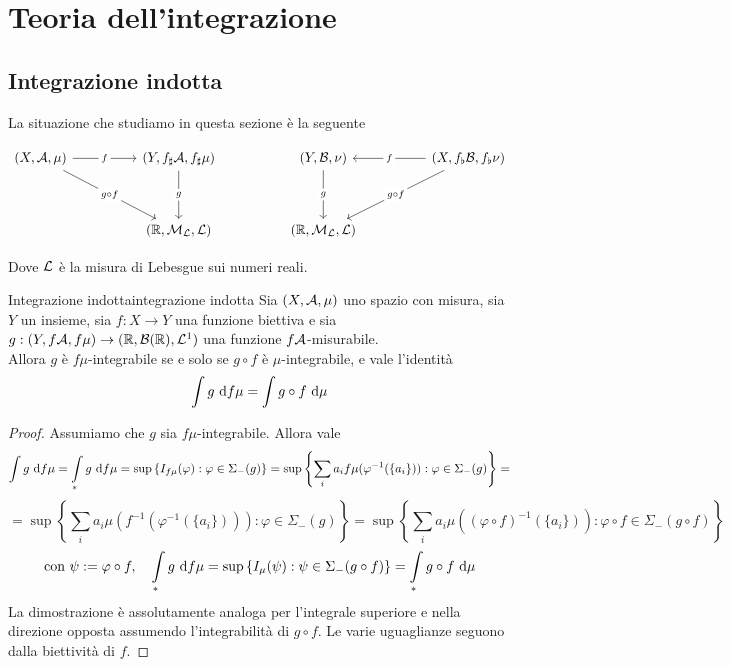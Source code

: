 \documentclass{article}
\renewcommand\A{\mc{A}}
\begin{document}
\section{Teoria dell'integrazione}

\subsection{Integrazione indotta}

La situazione che studiamo in questa sezione è la seguente

\[\begin{tikzcd}
	{(X,\A,\mu)} && {(Y, f_\sharp\A, f_\sharp\mu)} && {(Y, \B, \nu)} && {(X, f_\flat\B, f_\flat\nu)} \\
	\\
	&& {(\R, \M_\L, \L)} && {(\R,\M_\L, \L)}
	\arrow["f"{description}, from=1-1, to=1-3]
	\arrow["{g \circ f}"{description}, from=1-1, to=3-3]
	\arrow["g"{description}, from=1-3, to=3-3]
	\arrow["g"{description}, from=1-5, to=3-5]
	\arrow["f"{description}, from=1-7, to=1-5]
	\arrow["{g \circ f}"{description}, from=1-7, to=3-5]
\end{tikzcd}\]

Dove $\mathcal{L}$ è la misura di Lebesgue sui numeri reali.

\begin{theorem}{Integrazione indotta}{integrazione indotta}
    Sia $(X,\mathcal{A},\mu)$ uno spazio con misura, sia $Y$ un insieme, sia $f:X\to Y$ una funzione biettiva e sia $g:(Y,f\mathcal{A},f\mu)\to (\mathbb{R},\mathcal{B}(\mathbb{R}),\mathcal{L}^1)$ una funzione $f\mathcal{A}$-misurabile.\\
    Allora $g$ è $f\mu$-integrabile se e solo se $g\circ f$ è $\mu$-integrabile, e vale l'identità
    \[\int\limits g \text{ d} f\mu = \int\limits g\circ f \text{ d} \mu\]
    \begin{proof}
        Assumiamo che $g$ sia $f\mu$-integrabile. Allora vale
        \[\int\limits g \text{ d} f\mu = \int\limits_* g \text{ d} f\mu = \sup\left\{I_{f\mu}(\varphi) : \varphi \in \Sigma_-(g)\right\}=\sup\left\{ \sum_i a_i f\mu(\varphi^{-1}(\{a_i\})) : \varphi \in \Sigma_-(g) \right\} =\]
        \[ = \sup\left\{ \sum_i a_i \mu(f^{-1}(\varphi^{-1}(\{a_i\}))) : \varphi \in \Sigma_-(g) \right\} = \sup\left\{ \sum_i a_i \mu((\varphi \circ f)^{-1}(\{a_i\})) : \varphi \circ f \in \Sigma_-(g\circ f) \right\}\]
        \[\text{con } \psi := \varphi \circ f, \quad \int\limits_* g \text{ d} f\mu =\sup\left\{ I_\mu(\psi) : \psi \in \Sigma_-(g\circ f) \right\} = \int\limits_* g \circ f \text{ d} \mu\]
        La dimostrazione è assolutamente analoga per l'integrale superiore e nella direzione opposta assumendo l'integrabilità di $g\circ f$. Le varie uguaglianze seguono dalla biettività di $f$.
    \end{proof}
\end{theorem}
\end{document}
